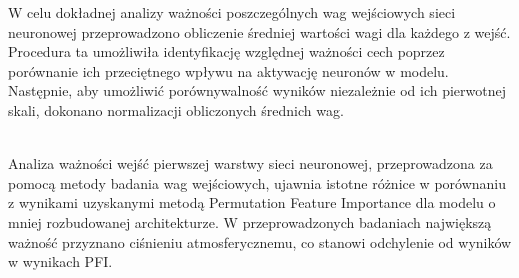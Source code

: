 \documentclass[a4paper,twoside,12pt]{book}
\begin{document}
W celu dokładnej analizy ważności poszczególnych wag wejściowych sieci neuronowej przeprowadzono obliczenie średniej wartości wagi dla każdego z wejść. Procedura ta umożliwiła identyfikację względnej ważności cech poprzez porównanie ich przeciętnego wpływu na aktywację neuronów w modelu. Następnie, aby umożliwić porównywalność wyników niezależnie od ich pierwotnej skali, dokonano normalizacji obliczonych średnich wag.
\begin{table}[!h]
  \centering
  \caption{Porównianie wag wejściowych dla pierwszej warstwy uproszczonego modelu}
\end{table}\\

Analiza ważności wejść pierwszej warstwy sieci neuronowej, przeprowadzona za pomocą metody badania wag wejściowych, ujawnia istotne różnice w porównaniu z wynikami uzyskanymi metodą Permutation Feature Importance dla modelu o mniej rozbudowanej architekturze. W przeprowadzonych badaniach największą ważność przyznano ciśnieniu atmosferycznemu, co stanowi odchylenie od wyników w wynikach PFI.
\end{document}
